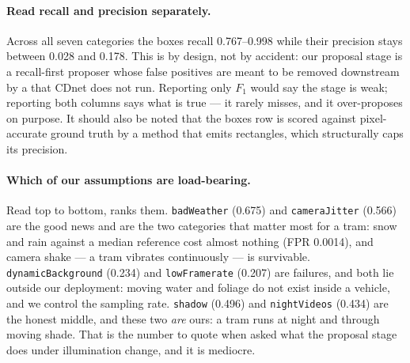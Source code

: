 \paragraph{Read recall and precision separately.}
Across all seven categories the boxes recall 0.767--0.998 while their precision
stays between 0.028 and 0.178. This is by design, not by accident: our proposal
stage is a recall-first proposer whose false positives are meant to be removed
downstream by a \judge{} that CDnet does not run. Reporting only $F_1$ would
say the stage is weak; reporting both columns says what is true --- it rarely
misses, and it over-proposes on purpose. It should also be noted that the boxes
row is scored against pixel-accurate ground truth by a method that emits
rectangles, which structurally caps its precision.

\paragraph{Which of our assumptions are load-bearing.}
Read top to bottom,  ranks them. \texttt{badWeather} (0.675)
and \texttt{cameraJitter} (0.566) are the good news and are the two categories
that matter most for a tram: snow and rain against a median reference cost
almost nothing (FPR 0.0014), and camera shake --- a tram vibrates continuously
--- is survivable. \texttt{dynamicBackground} (0.234) and
\texttt{lowFramerate} (0.207) are failures, and both lie outside our
deployment: moving water and foliage do not exist inside a vehicle, and we
control the sampling rate. \texttt{shadow} (0.496) and \texttt{nightVideos}
(0.434) are the honest middle, and these two \emph{are} ours: a tram runs at
night and through moving shade. That is the number to quote when asked what the
proposal stage does under illumination change, and it is mediocre.

